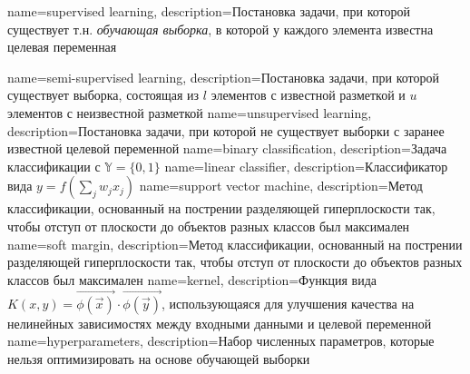\usepackage[acronym,toc]{glossaries}
\makenoidxglossaries

{
    name=supervised learning,
    description={Постановка задачи, при которой существует т.н. \textit{обучающая выборка}, в которой у каждого элемента известна целевая переменная}
}

{
    name=semi-supervised learning,
    description={Постановка задачи, при которой существует выборка, состоящая из $l$ элементов с известной разметкой и $u$ элементов с неизвестной разметкой}
}
{
    name=unsupervised learning,
    description={Постановка задачи, при которой не существует выборки с заранее известной целевой переменной}
}
{
    name=binary classification,
    description={Задача классификации с $\mathbb{Y} = \{0, 1\}$}
}
{
    name=linear classifier,
    description={Классификатор вида $y = f\left( \sum\limits_{j}^{} w_j x_j \right)$}
}
{
    name=support vector machine,
    description={Метод классификации, основанный на пострении разделяющей гиперплоскости так, чтобы отступ от плоскости до объектов разных классов был максимален}
}
{
    name=soft margin,
    description={Метод классификации, основанный на пострении разделяющей гиперплоскости так, чтобы отступ от плоскости до объектов разных классов был максимален}
}
{
    name=kernel,
    description={Функция вида $K(x, y) = \vec{\phi(\vec{x})} \cdot \vec{\phi(\vec{y})}$, использующаяся для улучшения качества на нелинейных зависимостях между входными данными и целевой переменной}
}
{
    name=hyperparameters,
    description={Набор численных параметров, которые нельзя оптимизировать на основе обучающей выборки}
}
